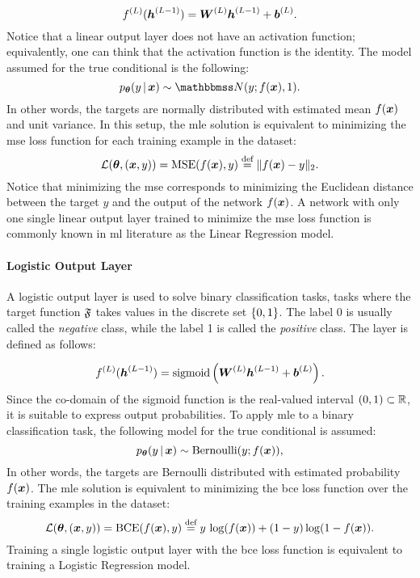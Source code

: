 $$\Layer{f}{L}(\LayerVector{h}{L-1}) = \LayerMatrix{W}{L} \LayerVector{h}{L-1} + \LayerVector{b}{L}.$$
Notice that a linear output layer does not have an activation function; equivalently, one can think that the activation function is the identity. The model assumed for the true conditional is the following:
$$p_{\Param}(y \given \Vector{x}) \sim \Normal{y; f(\Vector{x})}{1}.$$
In other words, the targets are normally distributed with estimated mean $f(\Vector{x})$ and unit variance. In this setup, the \gls{mle} solution is equivalent to minimizing the \gls{mse} loss function for each training example in the dataset:
$$\Loss(\Param, (\Vector{x}, y)) =\Fun{MSE}(f(\Vector{x}), y) \defeq \norm{ f(\Vector{x}) - y}_2.$$
Notice that minimizing the \gls{mse} corresponds to minimizing the Euclidean distance between the target $y$ and the output of the network $f(\Vector{x})$. A network with only one single linear output layer trained to minimize the \gls{mse} loss function is commonly known in \gls{ml} literature as the Linear Regression model.

\paragraph{Logistic Output Layer}
A logistic output layer is used to solve binary classification tasks, \ie tasks where the target function $\mathfrak{F}$ takes values in the discrete set $\left\{ 0, 1 \right\}$. The label 0 is usually called the \emph{negative} class, while the label 1 is called the \emph{positive} class. The layer is defined as follows:

$$\Layer{f}{L}(\LayerVector{h}{L-1}) = \sigmoid \Par{\LayerMatrix{W}{L} \LayerVector{h}{L-1} + \LayerVector{b}{L}}.$$
Since the co-domain of the sigmoid function is the real-valued interval $(0, 1) \subset \mathbb{R}$, it is suitable to express output probabilities. To apply \gls{mle} to a binary classification task, the following model for the true conditional is assumed:
$$p_{\Param}(y \given \Vector{x}) \sim \Fun{Bernoulli}(y; f(\Vector{x})),$$
In other words, the targets are Bernoulli distributed with estimated probability $f(\Vector{x})$. The \gls{mle} solution is equivalent to minimizing the \gls{bce} loss function over the training examples in the dataset:
$$\Loss(\Param, (\Vector{x}, y)) = \Fun{BCE}(f(\Vector{x}),y) \defeq y\, \log( f(\Vector{x})) + ( 1 - y) \log(1 -  f(\Vector{x})).$$
Training a single logistic output layer with the \gls{bce} loss function is equivalent to training a Logistic Regression model.

